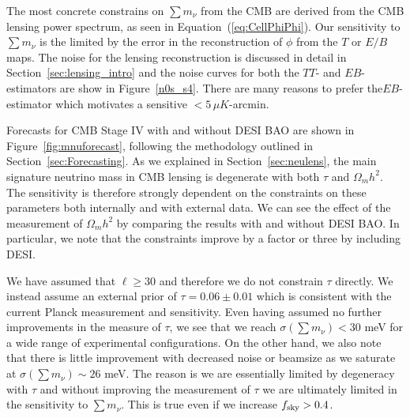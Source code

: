 The most concrete constrains on $\sum m_\nu$ from the CMB are derived from the CMB lensing power spectrum, as seen in Equation~(\ref{eq:CellPhiPhi}).  Our sensitivity to $\sum m_\nu$ is the limited by the error in the reconstruction of $\phi$ from the $T$ or $E/B$ maps.  The noise for the lensing reconstruction is discussed in detail in Section~\ref{sec:lensing_intro} and the noise curves for both the $TT$- and $EB$-estimators are show in Figure~\ref{n0s_s4}.  There are many reasons to prefer the$EB$-estimator which motivates a sensitive $< 5 \, \mu K$-arcmin.  

Forecasts for CMB Stage IV with and without DESI BAO are shown in Figure~\ref{fig:mnuforecast}, following the methodology outlined in Section~\ref{sec:Forecasting}.  As we explained in Section~\ref{sec:neulens}, the main signature neutrino mass in CMB lensing is degenerate with both $\tau$ and $\Omega_m h^2$.  The sensitivity is therefore strongly dependent on the constraints on these parameters both internally and with external data.  We can see the effect of the measurement of $\Omega_m h^2$ by comparing the results with and without DESI BAO.  In particular, we note that the constraints improve by a factor or three by including DESI.  

We have assumed that $\ell \geq 30$ and therefore we do not constrain $\tau$ directly.  We instead assume an external prior of $\tau = 0.06 \pm 0.01$ which is consistent with the current Planck measurement and sensitivity.  Even having assumed no further improvements in the measure of $\tau$, we see that we reach $\sigma(\sum m_\nu) < 30$ meV for a wide range of experimental configurations.  On the other hand, we also note that there is little improvement with decreased noise or beamsize as we saturate at $\sigma(\sum m_\nu) \sim 26$ meV.  The reason is we are essentially limited by degeneracy with $\tau$ and without improving the measurement of $\tau$ we are ultimately limited in the sensitivity to $\sum m_\nu$.  This is true even if we increase $f_{\rm sky} >0.4$.  






